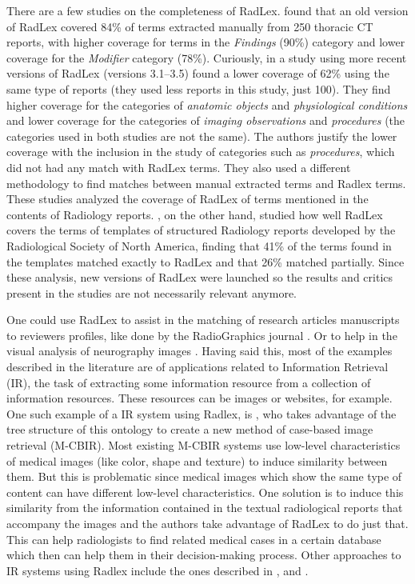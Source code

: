 There are a few studies on the completeness of RadLex. \citep{Marwede2008} found that an old version of RadLex covered 84\% of terms extracted manually from 250 thoracic CT reports, with higher coverage for terms in the \textit{Findings} (90\%) category and lower coverage for the \textit{Modifier} category (78\%). Curiously, in a study using more recent versions of RadLex (versions 3.1–3.5) \citep{Woods2013} found a lower coverage of 62\% using the same type of reports (they used less reports in this study, just 100). They find higher coverage for the categories of \textit{anatomic objects} and \textit{physiological conditions} and lower coverage for the categories of \textit{imaging observations} and \textit{procedures} (the categories used in both studies are not the same). The authors justify the lower coverage with the inclusion in the study of categories such as \textit{procedures}, which did not had any match with RadLex terms. They also used a different methodology to find matches between manual extracted terms and Radlex terms. These studies analyzed the coverage of RadLex of terms mentioned in the contents of Radiology reports. \citep{Hong2012}, on the other hand, studied how well RadLex covers the terms of templates of structured Radiology reports developed by the Radiological Society of North America, finding that 41\% of the terms found in the templates matched exactly to RadLex and that 26\% matched partially. Since these analysis, new versions of RadLex were launched so the results and critics present in the studies are not necessarily relevant anymore.

One could use RadLex to assist in the matching of research articles manuscripts to reviewers profiles, like done by the RadioGraphics journal \citep{Klein2013}. Or to help in the visual analysis of neurography images \citep{Wang2015}. Having said this, most of the examples described in the literature are of applications related to Information Retrieval (IR), the task of extracting some information resource from a collection of information resources. These resources can be images or websites, for example. One such example of a IR system using Radlex, is \citep{Spanier2016}, who takes advantage of the tree structure of this ontology to create a new method of case-based image retrieval (M-CBIR). Most existing M-CBIR systems use low-level characteristics of medical images (like color, shape and texture) to induce similarity between them. But this is problematic since medical images which show the same type of content can have different low-level characteristics. One solution is to induce this similarity from the information contained in the textual radiological reports that accompany the images and the authors take advantage of RadLex to do just that. This can help radiologists to find related medical cases in a certain database which then can help them in their decision-making process. Other approaches to IR systems using Radlex include the ones described in \citep{Do2010}, \citep{Kurtz2014} and \citep{Gerstmair2012}.


